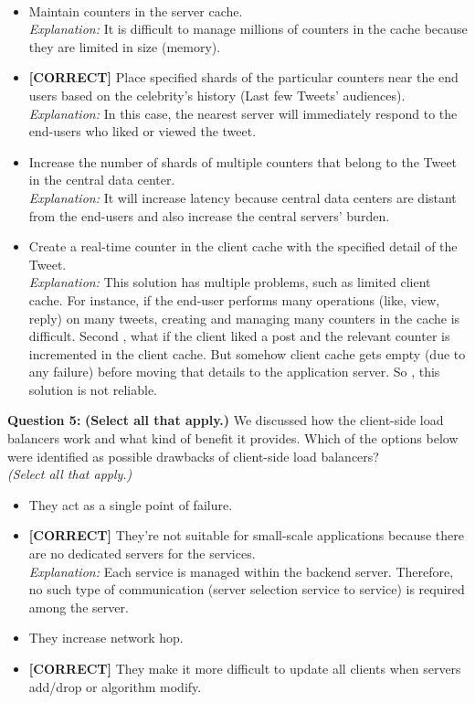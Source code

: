 \\[0.2cm]
\begin{itemize}
 \item Maintain counters in the server cache.
\\[0.1cm]
\textit{Explanation:} 
It is difficult to manage millions of counters in the cache because they are limited in size (memory).
 \item \textbf{[CORRECT]} Place specified shards of the particular counters near the end users based on the celebrity's history (Last few Tweets' audiences).
\\[0.1cm]
\textit{Explanation:} 
In this case, the nearest server will immediately respond to the end-users who liked or viewed the tweet.
 \item Increase the number of shards of multiple counters that belong to the Tweet in the central data center.
\\[0.1cm]
\textit{Explanation:} 
It will increase latency because central data centers are distant from the end-users and also increase the central servers' burden.
 \item Create a real-time counter in the client cache with the specified detail of the Tweet.
\\[0.1cm]
\textit{Explanation:} 
This solution has multiple problems, such as limited client cache. For instance, if the end-user performs many operations (like, view, reply) on many tweets, creating and managing many counters in the cache is difficult. Second , what if the client liked a post and the relevant counter is incremented in the client cache. But somehow client cache gets empty (due to any failure) before moving that details to the application server. So
, this solution is not reliable.
\end{itemize}
\vspace{0.3cm}
\noindent
\textbf{Question 5:} \textbf{(Select all that apply.)} We discussed how the client-side load balancers work and what kind of benefit it provides. Which of the options below were identified as possible drawbacks of client-side load balancers?
\\
\textit{(Select all that apply.)}
\\[0.2cm]
\begin{itemize}
 \item They act as a single point of failure.
 \item \textbf{[CORRECT]} They're not suitable for small-scale applications because there are no dedicated servers for the services.
\\[0.1cm]
\textit{Explanation:} 
Each service is managed within the backend server. Therefore, no such type of communication (server selection service to service) is required among the server.
 \item They increase network hop.
 \item \textbf{[CORRECT]} They make it more difficult to update all clients when servers add/drop or algorithm modify.
\end{itemize}



